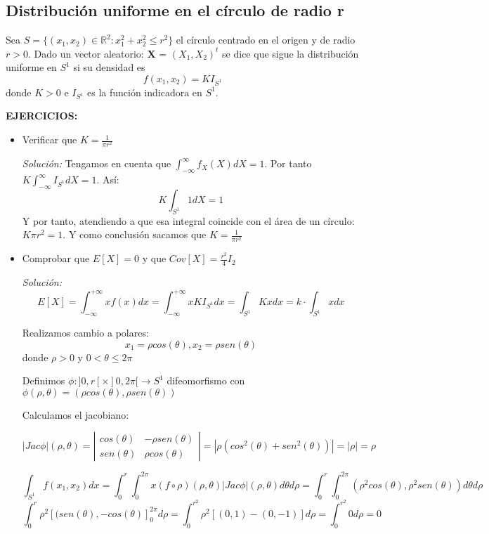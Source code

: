 \documentclass{article}
\theoremstyle{theorem-style}  %
\theoremstyle{definition}
\theoremstyle{example-style}
\begin{document}
	\subsection{Distribución uniforme en el círculo de radio r}
	
	Sea $S=\{(x_1, x_2) \in \mathbb{R}^2: x_1^2+x_2^2 \leq r^2\}$ el círculo centrado en el origen y de radio $r>0$. Dado un vector aleatorio: \textbf{X} = $(X_1, X_2)^t$ se dice que sigue la distribución uniforme en $S^1$ si su densidad es $$f(x_1,x_2) = KI_{S^1}$$ donde $K>0$ e $I_{S^1}$ es la función indicadora en $S^1$.
	
	\textbf{EJERCICIOS:}
	
	\begin{itemize}
		\item Verificar que $K=\frac{1}{\pi r^2}$
		
		\textit{Solución:} Tengamos en cuenta que $\int_{-\infty}^{\infty} f_X(X) dX = 1$. Por tanto $K \int_{-\infty}^{\infty} I_{S^1} dX =1 $. Así: $$K \int_{S^1}^{}1dX = 1 $$ Y por tanto, atendiendo a que esa integral coincide con el área de un círculo: $K\pi r^2 = 1$. Y como conclusión sacamos que $K=\frac{1}{\pi r^2}$
		
		\item Comprobar que $E[X]=0$ y que $Cov[X] = \frac{r^2}{4}I_2$
		
		\textit{Solución:}
		$$E[X]=\int_{-\infty}^{+\infty}xf(x) dx = \int_{-\infty}^{+\infty}xKI_{S^1} dx = \int_{S^1}Kx dx = k \cdot \int_{S^1}x dx$$ 
		
		Realizamos cambio a polares:
		 $$x_1 = \rho cos(\theta), x_2 = \rho sen(\theta)$$
		donde $\rho>0$ y $0<\theta\leq2\pi$
		
		Definimos $\phi:]0,r[\times]0,2\pi[\longrightarrow S^1$ difeomorfismo con $\phi(\rho,\theta) = (\rho cos(\theta), \rho sen(\theta))$
		
		Calculamos el jacobiano:
		
		$$|Jac \phi|(\rho,\theta) = \left| \begin{array}{cc}
		cos(\theta) & -\rho sen(\theta) \\
		sen(\theta) & \rho cos(\theta)  \end{array} \right| = |\rho(cos^2(\theta)+sen^2(\theta))| = |\rho| = \rho$$
		
		$$\int_{S^1}f(x_1,x_2) dx = \int_{0}^{r}\int_{0}^{2\pi}x(f\circ \rho)(\rho,\theta)|Jac \phi|(\rho,\theta)d\theta d\rho = \int_{0}^{r}\int_{0}^{2\pi}(\rho^2cos(\theta),\rho^2sen(\theta))d\theta d\rho$$
		$$ \int_{0}^{r}\rho^2\left[(sen(\theta),-cos(\theta)\right]_0^{2\pi} d\rho = \int_0^{r^2}\rho^2\left[(0,1)-(0,-1)\right]d\rho = \int_0^{r^2}0d\rho = 0$$		
		

\end{itemize}
\end{document}
